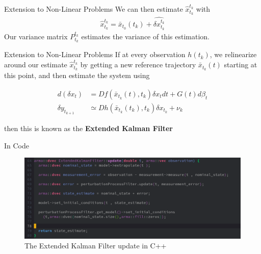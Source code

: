 \documentclass{beamer}
\begin{document}
\begin{frame}{Extension to Non-Linear Problems}
  We can then estimate $\hat{x}_{t_k}^{t_k}$ with
  \begin{align}
    \hat{x}_{t_k}^{t_k} = \bar{x}_{t_0}(t_k) + \hat{\delta x_{t_k}^{t_k}}
  \end{align}
  Our variance matrix $P_{t_k}^{t_k}$ estimates the variance of this
  estimation.
\end{frame}

\begin{frame}{Extension to Non-Linear Problems}
  If at every observation $h(t_k)$, we relinearize around our estimate
  $\hat{x}_{t_k}^{t_k}$ by getting a new reference trajectory $\bar{x}_{t_k}(t)$
  starting at this point, and then estimate the system using

  
  \begin{align}
    d(\delta x_t) &= Df(\bar{x}_{t_k}(t),t_k) \delta x_t dt + G(t) d\beta_t \\
    \delta y_{t_{k+1}} &\simeq Dh(\bar{x}_{t_k}(t_k),t_k) \delta x_{t_k} + \nu_k
  \end{align}

  then this is known as the \textbf{Extended Kalman Filter}
\end{frame}

\begin{frame}{In Code}

\begin{figure}
  \includegraphics[scale=0.3]{ekf_implementation.png}
  \caption{The Extended Kalman Filter update in C++}

\end{figure}
\end{frame}
\end{document}
